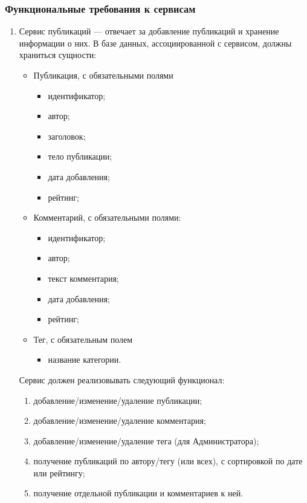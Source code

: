 \documentclass{bmstu-gost-7-32}
\begin{document}
\subsubsection{Функциональные требования к сервисам}

\begin{enumerate}
	\item Сервис публикаций — отвечает за добавление публикаций и хранение информации о них.
	В базе данных, ассоциированной с сервисом, должны храниться сущности:
	\begin{itemize}
		\item Публикация, с обязательными полями
		\begin{itemize}
			\item идентификатор;
			\item автор;
			\item заголовок;
			\item тело публикации;
			\item дата добавления;
			\item рейтинг;
		\end{itemize}
		\item Комментарий, с обязательными полями:
		\begin{itemize}
			\item идентификатор;
			\item автор;
			\item текст комментария;
			\item дата добавления;
			\item рейтинг;
		\end{itemize}
		\item Тег, с обязательным полем
		\begin{itemize}
			\item название категории.
		\end{itemize}
	\end{itemize}
	Сервис должен реализовывать следующий функционал:
	\begin{enumerate}
		\item добавление/изменение/удаление публикации;
		\item добавление/изменение/удаление комментария;
		\item добавление/изменение/удаление тега (для Администратора);
		\item получение публикаций по автору/тегу (или всех), с сортировкой по дате или рейтингу;
		\item получение отдельной публикации и комментариев к ней.
	\end{enumerate}

\end{enumerate}
\end{document}
